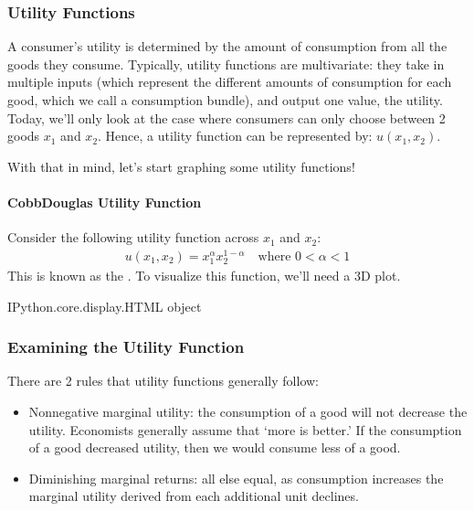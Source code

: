 \documentclass[letterpaper,10pt,english]{jupyterBook}
\begin{document}
\subsubsection{Utility Functions}
\label{\detokenize{content/05-utility/utility:utility-functions}}
\sphinxAtStartPar
A consumer’s utility is determined by the amount of consumption from all the goods they consume. Typically, utility functions are multivariate: they take in multiple inputs (which represent the different amounts of consumption for each good, which we call a consumption bundle), and output one value, the utility. Today, we’ll only look at the case where consumers can only choose between 2 goods \(x_1\) and \(x_2\). Hence, a utility function can be represented by: \(u(x_1,x_2)\).

\sphinxAtStartPar
With that in mind, let’s start graphing some utility functions!


\paragraph{Cobb\sphinxhyphen{}Douglas Utility Function}
\label{\detokenize{content/05-utility/utility:cobb-douglas-utility-function}}
\sphinxAtStartPar
Consider the following utility function across \(x_1\) and \(x_2\):
\begin{equation*}
\begin{split}u(x_1, x_2)=x_1^{\alpha}x_2^{1-\alpha}\quad\text{where } 0<\alpha<1\end{split}
\end{equation*}
\sphinxAtStartPar
This is known as the . To visualize this function, we’ll need a 3D plot.

\begin{sphinxVerbatim}[commandchars=\\\{\}]
\PYGZlt{}IPython.core.display.HTML object\PYGZgt{}
\end{sphinxVerbatim}


\subsubsection{Examining the Utility Function}
\label{\detokenize{content/05-utility/utility:examining-the-utility-function}}
\sphinxAtStartPar
There are 2 rules that utility functions generally follow:
\begin{itemize}
\item {} 
\sphinxAtStartPar
Non\sphinxhyphen{}negative marginal utility: the consumption of a good will not decrease the utility. Economists generally assume that ‘more is better.’ If the consumption of a good decreased utility, then we would consume less of a good.

\item {} 
\sphinxAtStartPar
Diminishing marginal returns: all else equal, as consumption increases the marginal utility derived from each additional unit declines.

\end{itemize}
\end{document}
